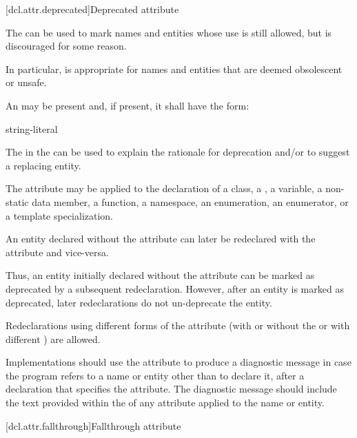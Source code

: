 [dcl.attr.deprecated]{Deprecated attribute}%

\pnum
The   can be used to mark names and entities
whose use is still allowed, but is discouraged for some reason.
\begin{note}
In particular,
 is appropriate for names and entities that are deemed obsolescent or
unsafe.
\end{note}
An
 may be present and, if present, it shall have the form:
\begin{ncbnf}
\terminal{(} string-literal \terminal{)}
\end{ncbnf}
\begin{note}
The  in the 
can be used to explain the rationale for deprecation and/or to suggest a replacing entity.
\end{note}

\pnum
The attribute may be applied to the declaration of
a class,
a ,
a variable,
a non-static data member,
a function,
a namespace,
an enumeration,
an enumerator, or
a template specialization.

\pnum
An entity declared without the  attribute can later be redeclared
with the attribute and vice-versa.
\begin{note}
Thus, an entity initially declared without the
attribute can be marked as deprecated by a subsequent redeclaration. However, after an entity
is marked as deprecated, later redeclarations do not un-deprecate the entity.
\end{note}
Redeclarations using different forms of the attribute (with or without the
 or with different
) are allowed.

\pnum
\recommended
Implementations should use the  attribute to produce a diagnostic
message in case the program refers to a name or entity other than to declare it, after a
declaration that specifies the attribute. The diagnostic message should include the text provided
within the  of any  attribute applied
to the name or entity.

[dcl.attr.fallthrough]{Fallthrough attribute}

